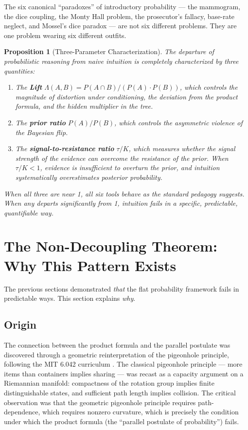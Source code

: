 \documentclass[12pt]{article}
\newtheorem{proposition}[theorem]{Proposition}
\begin{document}
The six canonical ``paradoxes'' of introductory probability --- the mammogram, the dice coupling, the Monty Hall problem, the prosecutor's fallacy, base-rate neglect, and Mossel's dice paradox --- are not six different problems. They are one problem wearing six different outfits.

\begin{proposition}[Three-Parameter Characterization]
The departure of probabilistic reasoning from naive intuition is completely characterized by three quantities:
\begin{enumerate}[nosep]
\item The \textbf{Lift} $\Lambda(A,B) = P(A \cap B) / (P(A) \cdot P(B))$, which controls the magnitude of distortion under conditioning, the deviation from the product formula, and the hidden multiplier in the tree.
\item The \textbf{prior ratio} $P(A)/P(B)$, which controls the asymmetric violence of the Bayesian flip.
\item The \textbf{signal-to-resistance ratio} $\tau/K$, which measures whether the signal strength of the evidence can overcome the resistance of the prior. When $\tau/K < 1$, evidence is insufficient to overturn the prior, and intuition systematically overestimates posterior probability.
\end{enumerate}
When all three are near 1, all six tools behave as the standard pedagogy suggests. When any departs significantly from 1, intuition fails in a specific, predictable, quantifiable way.
\end{proposition}

\section{The Non-Decoupling Theorem: Why This Pattern Exists}

The previous sections demonstrated \textit{that} the flat probability framework fails in predictable ways. This section explains \textit{why}.

\subsection{Origin}

The connection between the product formula and the parallel postulate was discovered through a geometric reinterpretation of the pigeonhole principle, following the MIT 6.042 curriculum \cite{moitra2024}. The classical pigeonhole principle --- more items than containers implies sharing --- was recast as a capacity argument on a Riemannian manifold: compactness of the rotation group implies finite distinguishable states, and sufficient path length implies collision. The critical observation was that the geometric pigeonhole principle requires path-dependence, which requires nonzero curvature, which is precisely the condition under which the product formula (the ``parallel postulate of probability'') fails.
\end{document}
